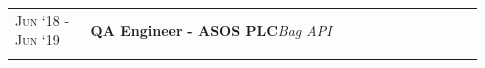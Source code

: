 \documentclass[a4paper,10pt]{extarticle} %
\begin{document}
{\begin{tabular}{>{\raggedright\arraybackslash}p{0.15\linewidth} | >{\raggedright\arraybackslash}p{0.78\linewidth}}
\textsc{Jun ‘18 - Jun ‘19} & \textbf{QA Engineer} \textbf{ - ASOS PLC}\hfill\textit{Bag API}\\
\multicolumn{2}{c}{} \\


\end{tabular}}
\end{document}
